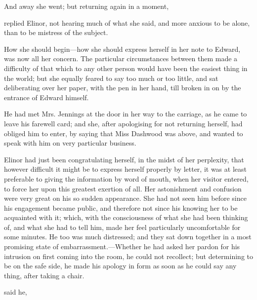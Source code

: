 And away she went; but returning again in a moment,


 replied Elinor, not hearing much of what she said, and more anxious to be alone, than to be mistress of the subject.

How she should begin---how she should express herself in her note to Edward, was now all her concern. The particular circumstances between them made a difficulty of that which to any other person would have been the easiest thing in the world; but she equally feared to say too much or too little, and sat deliberating over her paper, with the pen in her hand, till broken in on by the entrance of Edward himself.

He had met Mrs. Jennings at the door in her way to the carriage, as he came to leave his farewell card; and she, after apologising for not returning herself, had obliged him to enter, by saying that Miss Dashwood was above, and wanted to speak with him on very particular business.

Elinor had just been congratulating herself, in the midst of her perplexity, that however difficult it might be to express herself properly by letter, it was at least preferable to giving the information by word of mouth, when her visitor entered, to force her upon this greatest exertion of all. Her astonishment and confusion were very great on his so sudden appearance. She had not seen him before since his engagement became public, and therefore not since his knowing her to be acquainted with it; which, with the consciousness of what she had been thinking of, and what she had to tell him, made her feel particularly uncomfortable for some minutes. He too was much distressed; and they sat down together in a most promising state of embarrassment.---Whether he had asked her pardon for his intrusion on first coming into the room, he could not recollect; but determining to be on the safe side, he made his apology in form as soon as he could say any thing, after taking a chair.

 said he, 

